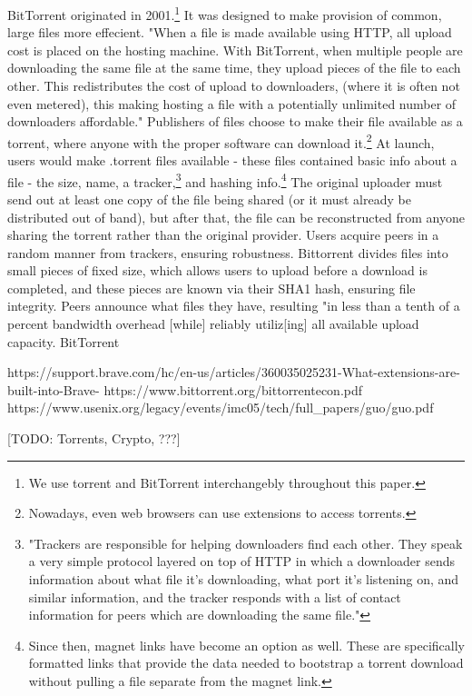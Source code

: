 \documentclass[12pt]{report}
\begin{document}
BitTorrent originated in 2001.\footnote{We use torrent and BitTorrent interchangebly throughout this paper.} It was designed to make provision of common, large files more effecient. "When a file is made available using HTTP, all upload cost is placed on the hosting machine. With BitTorrent, when multiple people are downloading the same file at the same time, they upload pieces of the file to each other. This redistributes the cost of upload to downloaders, (where it is often not even metered), this making hosting a file with a potentially unlimited number of downloaders affordable."\cite{torrent} Publishers of files choose to make their file available as a torrent, where anyone with the proper software can download it.\footnote{Nowadays, even web browsers can use extensions to access torrents.\cite{webtorrent}} At launch, users would make .torrent files available - these files contained basic info about a file - the size, name, a tracker,\footnote{"Trackers are responsible for helping downloaders find each other. They speak a very simple protocol layered on top of HTTP in which a downloader sends information about what file it’s downloading, what port it’s listening on, and similar information, and the tracker responds with a list of contact information for peers which are downloading the same file."\cite{torrent}} and hashing info.\footnote{Since then, magnet links have become an option as well. These are specifically formatted links that provide the data needed to bootstrap a torrent download without pulling a file separate from the magnet link.}\cite{torrent} The original uploader must send out at least one copy of the file being shared (or it must already be distributed out of band), but after that, the file can be reconstructed from anyone sharing the torrent rather than the original provider. Users acquire peers in a random manner from trackers, ensuring robustness. Bittorrent divides files into small pieces of fixed size, which allows users to upload before a download is completed, and these pieces are known via their SHA1 hash, ensuring file integrity. Peers announce what files they have, resulting "in less than a tenth of a percent bandwidth overhead [while] reliably utiliz[ing] all available upload capacity.\cite{torrent} BitTorrent 

https://support.brave.com/hc/en-us/articles/360035025231-What-extensions-are-built-into-Brave-
https://www.bittorrent.org/bittorrentecon.pdf
https://www.usenix.org/legacy/events/imc05/tech/full_papers/guo/guo.pdf

[TODO: Torrents, Crypto, ???]
\end{document}

